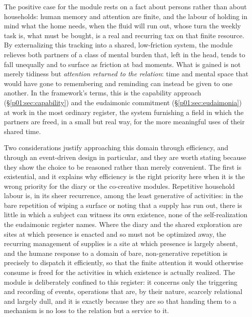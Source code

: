 The positive case for the module rests on a fact about persons rather than about households: human memory and attention are finite, and the labour of holding in mind what the home needs, when the fluid will run out, whose turn the weekly task is, what must be bought, is a real and recurring tax on that finite resource. By externalizing this tracking into a shared, low-friction system, the module relieves both partners of a class of mental burden that, left in the head, tends to fall unequally and to surface as friction at bad moments. What is gained is not merely tidiness but \emph{attention returned to the relation}: time and mental space that would have gone to remembering and reminding can instead be given to one another. In the framework's terms, this is the capability approach (§\ref{p01:sec:capability}) and the eudaimonic commitment (§\ref{p01:sec:eudaimonia}) at work in the most ordinary register, the system furnishing a field in which the partners are freed, in a small but real way, for the more meaningful uses of their shared time.

Two considerations justify approaching this domain through efficiency, and through an event-driven design in particular, and they are worth stating because they show the choice to be reasoned rather than merely convenient. The first is existential, and it explains why efficiency is the right priority here when it is the wrong priority for the diary or the co-creative modules. Repetitive household labour is, in its sheer recurrence, among the least generative of activities: in the bare repetition of wiping a surface or noting that a supply has run out, there is little in which a subject can witness its own existence, none of the self-realization the eudaimonic register names. Where the diary and the shared exploration are sites at which presence is enacted and so must not be optimized away, the recurring management of supplies is a site at which presence is largely absent, and the humane response to a domain of bare, non-generative repetition is precisely to dispatch it efficiently, so that the finite attention it would otherwise consume is freed for the activities in which existence is actually realized. The module is deliberately confined to this register: it concerns only the triggering and recording of events, operations that are, by their nature, scarcely relational and largely dull, and it is exactly because they are so that handing them to a mechanism is no loss to the relation but a service to it.

